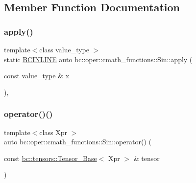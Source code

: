 \subsection{Member Function Documentation}
\mbox{\label{structbc_1_1oper_1_1cmath__functions_1_1Sin_aead092daf7e5849aa2a3e001080c867e}} 
\subsubsection{\texorpdfstring{apply()}{apply()}}
{\footnotesize\ttfamily template$<$class value\+\_\+type $>$ \\
static \hyperlink{common_8h_a6699e8b0449da5c0fafb878e59c1d4b1}{B\+C\+I\+N\+L\+I\+NE} auto bc\+::oper\+::cmath\+\_\+functions\+::\+Sin\+::apply (\begin{DoxyParamCaption}\item[{const value\+\_\+type \&}]{x }\end{DoxyParamCaption})\hspace{0.3cm}{\ttfamily [inline]}, {\ttfamily [static]}}

\mbox{\label{structbc_1_1oper_1_1cmath__functions_1_1Sin_ad10a5102345942d4a32cf4449b072082}} 
\subsubsection{\texorpdfstring{operator()()}{operator()()}\hspace{0.1cm}{\footnotesize\ttfamily [1/3]}}
{\footnotesize\ttfamily template$<$class Xpr $>$ \\
auto bc\+::oper\+::cmath\+\_\+functions\+::\+Sin\+::operator() (\begin{DoxyParamCaption}\item[{const \hyperlink{classbc_1_1tensors_1_1Tensor__Base}{bc\+::tensors\+::\+Tensor\+\_\+\+Base}$<$ Xpr $>$ \&}]{tensor }\end{DoxyParamCaption})\hspace{0.3cm}{\ttfamily [inline]}}

